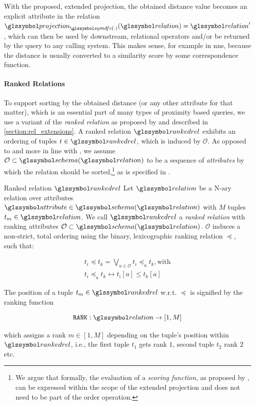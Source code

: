 With the proposed, extended projection, the obtained distance value becomes an explicit attribute in the relation $\projection_{\symdfc(\cdot)}(\relation) = \relation^{\prime}$, which can then be used by downstream, relational operators and/or be returned by the query to any calling system. This makes sense, for example in \acrshort{nns}, because the distance is usually converted to a similarity score by some correspondence function.

\paragraph{Ranked Relations}

To support sorting by the obtained distance (or any other attribute for that matter), which is an essential part of many types of proximity based queries, we use a variant of the \emph{ranked relation} as proposed by \cite{Chengkai:2005RankSQL} and described in \cref{section:rel_extensions}. A ranked relation $\rankedrel$ exhibits an ordering of tuples $t \in \rankedrel$, which is induced by $\mathcal{O}$. As opposed to \cite{Chengkai:2005RankSQL} and more in line with \cite{Garcia:2009Database}, we assume $\mathcal{O} \subset \schema (\relation)$ to be a sequence of \emph{attributes} by which the relation should be sorted,\footnote{We argue that formally, the evaluation of a \emph{scoring function}, as proposed by \cite{Chengkai:2005RankSQL}, can be expressed within the scope of the extended projection and does not need to be part of the order operation.} as is specified in .

\begin{definition}[label=definition:ranked_relation]{Ranked relation $\rankedrel$}{}
Let $\relation$ be a N-ary relation over attributes $\attribute \in \schema (\relation)$ with $M$ tuples $t_m \in \relation$. We call $\rankedrel$ a \emph{ranked relation} with ranking attributes $\mathcal{O} \subset \schema (\relation)$. $\mathcal{O}$ induces a non-strict, total ordering using the binary, lexicographic ranking relation $\preceq$, such that:

\begin{gather*}
    t_i \preceq t_k  = \bigvee_{a \in \mathcal{O}} t_i \preceq_{a} t_k, \textrm{with} \\ 
    t_i \preceq_{a} t_k  \leftrightarrow t_i \left[ a \right] \leq t_k \left[ a \right]
\end{gather*}

The position of a tuple $t_m \in \rankedrel$ w.r.t. $\preceq$ is signified by the ranking function

\begin{equation*}
    \mathtt{RANK}: \relation \rightarrow \left[ 1, M \right]
\end{equation*}

which assigns a rank $m \in \left[ 1, M \right]$ depending on the tuple's position within $\rankedrel$, i.e., the first tuple $t_1$ gets rank $1$, second tuple $t_2$ rank $2$ etc.

\end{definition}

